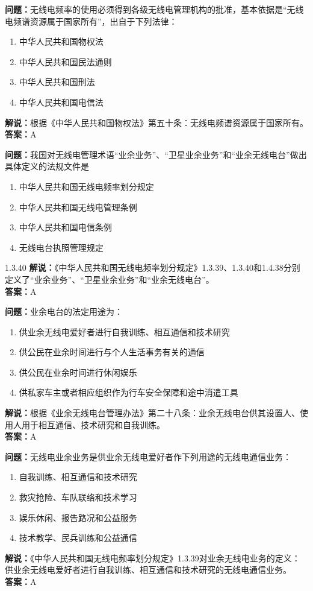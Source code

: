 \documentclass{ctexbook}%
\begin{document}
\textbf{问题：}无线电频率的使用必须得到各级无线电管理机构的批准，基本依据是“无线电频谱资源属于国家所有”，出自于下列法律：
\begin{enumerate}[label=\Alph*), leftmargin=3em]
\item 中华人民共和国物权法
\item 中华人民共和国民法通则
\item 中华人民共和国刑法
\item 中华人民共和国电信法
\end{enumerate}
\textbf{解说：}根据《中华人民共和国物权法》第五十条：无线电频谱资源属于国家所有。\\
\textbf{答案：}A

\textbf{问题：}我国对无线电管理术语“业余业务”、“卫星业余业务”和“业余无线电台”做出具体定义的法规文件是
\begin{enumerate}[label=\Alph*), leftmargin=3em]
\item 中华人民共和国无线电频率划分规定
\item 中华人民共和国无线电管理条例
\item 中华人民共和国电信条例
\item 无线电台执照管理规定
\end{enumerate}1.3.40
\textbf{解说：}《中华人民共和国无线电频率划分规定》1.3.39、1.3.40和1.4.38分别定义了“业余业务”、“卫星业余业务”和“业余无线电台”。\\
\textbf{答案：}A

\textbf{问题：}业余电台的法定用途为：
\begin{enumerate}[label=\Alph*), leftmargin=3em]
\item 供业余无线电爱好者进行自我训练、相互通信和技术研究
\item 供公民在业余时间进行与个人生活事务有关的通信
\item 供公民在业余时间进行休闲娱乐
\item 供私家车主或者相应组织作为行车安全保障和途中消遣工具
\end{enumerate}
\textbf{解说：}根据《业余无线电台管理办法》第二十八条：业余无线电台供其设置人、使用人用于相互通信、技术研究和自我训练。\\
\textbf{答案：}A

\textbf{问题：}无线电业余业务是供业余无线电爱好者作下列用途的无线电通信业务：
\begin{enumerate}[label=\Alph*), leftmargin=3em]
\item 自我训练、相互通信和技术研究
\item 救灾抢险、车队联络和技术学习
\item 娱乐休闲、报告路况和公益服务
\item 技术教学、民兵训练和公益通信
\end{enumerate}
\textbf{解说：}《中华人民共和国无线电频率划分规定》1.3.39对业余无线电业务的定义：供业余无线电爱好者进行自我训练、相互通信和技术研究的无线电通信业务。\\
\textbf{答案：}A
\end{document}
